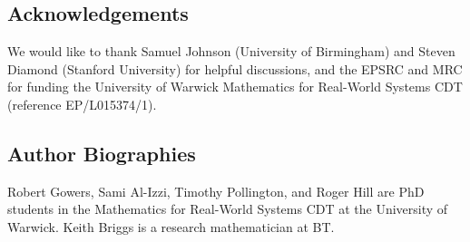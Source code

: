 \documentclass[twocolumn,secnumarabic,amssymb, nobibnotes, aps, prl,superscriptaddress]{revtex4-1}
\begin{document}
\subsection*{Acknowledgements}
\noindent{}We would like to thank Samuel Johnson (University of Birmingham) and Steven Diamond (Stanford University) for helpful discussions, and the EPSRC and MRC for funding the University of Warwick Mathematics for Real-World Systems CDT (reference EP/L015374/1).

\subsection*{Author Biographies}
\noindent{}Robert Gowers, Sami Al-Izzi, Timothy Pollington, and Roger Hill are PhD students in the Mathematics for Real-World Systems CDT at the University of Warwick.  Keith Briggs is a research mathematician at BT.

\vspace{0.2cm}

 


\end{document}
